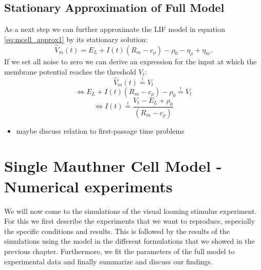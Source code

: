 \documentclass[a4paper,10pt,hidelinks]{scrreprt}
\begin{document}
	\section{Stationary Approximation of Full Model}
	As a next step we can further approximate the LIF model in equation \ref{eq:mcell_approx1} by 
	its stationary solution:
	\begin{equation}
	\hat{V}_m(t) = E_{L} + I(t)(R_{m} - c_{\rho}) - \rho_{0} - 
	\eta_{\rho} +  \eta _m.
	\end{equation}
	If we set all noise to zero we can derive an expression for the input at which the membrane 
	potential reaches the threshold $V_{t}$:
	\begin{equation}
	\hat{V}_m(t) \overset{!}{=} V_t
	\end{equation}
	\begin{equation}
	\Leftrightarrow E_{L} + I(t)(R_{m} - c_{\rho}) - \rho_{0} 
	\overset{!}{=} V_t
	\end{equation}
	\begin{equation}
	\Leftrightarrow I(t)
	\overset{!}{=} \frac{V_t - E_{L} + \rho_{0}}{(R_{m} - c_{\rho})}
	\label{eq:crit_input}
	\end{equation}
	\begin{itemize}
		\item maybe discuss relation to first-passage time problems
	\end{itemize}


	\chapter{Single Mauthner Cell Model - Numerical experiments}
	We will now come to the simulations of the visual looming stimulus experiment.
	For this we first describe the experiments that we want to reproduce, especially the specific 
	conditions and results.
	This is followed by the results of the simulations using the model in the different 
	formulations that we showed in the previous chapter.
	Furthermore, we fit the parameters of the full model to experimental data and finally summarize 
	and discuss our findings.
\end{document}
